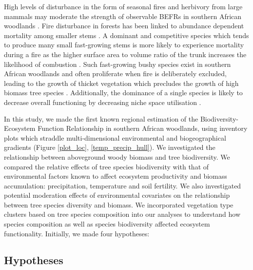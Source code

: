 \documentclass[11pt,a4paper]{article}
\begin{document}
High levels of disturbance in the form of seasonal fires and herbivory from large mammals may moderate the strength of observable BEFRs in southern African woodlands \citep{Staver2009, Bond2005}. Fire disturbance in forests has been linked to abundance dependent mortality among smaller stems \citep{Roques2001}. A dominant and competitive species which tends to produce many small fast-growing stems is more likely to experience mortality during a fire as the higher surface area to volume ratio of the trunk increases the likelihood of combustion \citep{}. Such fast-growing bushy species exist in southern African woodlands and often proliferate when fire is deliberately excluded, leading to the growth of thicket vegetation which precludes the growth of high biomass tree species \citep{Higgins2007}. Additionally, the dominance of a single species is likely to decrease overall functioning by decreasing niche space utilisation \citep{Cardinale2002}.

In this study, we made the first known regional estimation of the Biodiversity-Ecosystem Function Relationship in southern African woodlands, using inventory plots which straddle multi-dimensional environmental and biogeographical gradients (Figure \autoref{plot_loc}, \autoref{temp_precip_hull}). We investigated the relationship between aboveground woody biomass and tree biodiversity. We compared the relative effects of tree species biodiversity with that of environmental factors known to affect ecosystem productivity and biomass accumulation: precipitation, temperature and soil fertility. We also investigated potential moderation effects of environmental covariates on the relationship between tree species diversity and biomass. We incorporated vegetation type clusters based on tree species composition \citep{} into our analyses to understand how species composition as well as species biodiversity affected ecosystem functionality. Initially, we made four hypotheses: 

\subsection{Hypotheses}
\end{document}
